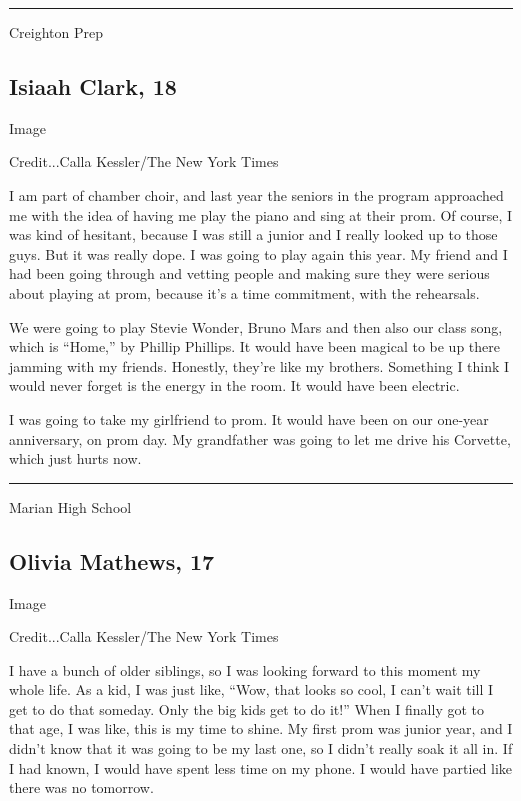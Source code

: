 \begin{center}\rule{0.5\linewidth}{\linethickness}\end{center}

Creighton Prep

\hypertarget{isiaah-clark-18}{%
\subsection{Isiaah Clark, 18}\label{isiaah-clark-18}}

Image

Credit...Calla Kessler/The New York Times

I am part of chamber choir, and last year the seniors in the program
approached me with the idea of having me play the piano and sing at
their prom. Of course, I was kind of hesitant, because I was still a
junior and I really looked up to those guys. But it was really dope. I
was going to play again this year. My friend and I had been going
through and vetting people and making sure they were serious about
playing at prom, because it's a time commitment, with the rehearsals.

We were going to play Stevie Wonder, Bruno Mars and then also our class
song, which is ``Home,'' by Phillip Phillips. It would have been magical
to be up there jamming with my friends. Honestly, they're like my
brothers. Something I think I would never forget is the energy in the
room. It would have been electric.

I was going to take my girlfriend to prom. It would have been on our
one-year anniversary, on prom day. My grandfather was going to let me
drive his Corvette, which just hurts now.

\begin{center}\rule{0.5\linewidth}{\linethickness}\end{center}

Marian High School

\hypertarget{olivia-mathews-17}{%
\subsection{Olivia Mathews, 17}\label{olivia-mathews-17}}

Image

Credit...Calla Kessler/The New York Times

I have a bunch of older siblings, so I was looking forward to this
moment my whole life. As a kid, I was just like, ``Wow, that looks so
cool, I can't wait till I get to do that someday. Only the big kids get
to do it!'' When I finally got to that age, I was like, this is my time
to shine. My first prom was junior year, and I didn't know that it was
going to be my last one, so I didn't really soak it all in. If I had
known, I would have spent less time on my phone. I would have partied
like there was no tomorrow.

